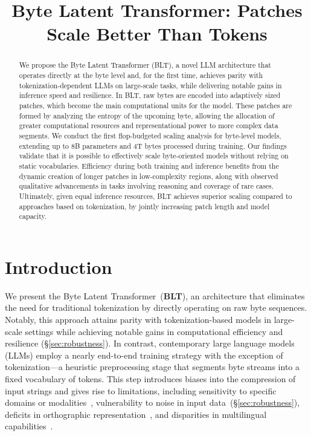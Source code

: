 \title{Byte Latent Transformer: Patches Scale Better Than Tokens}

\begin{abstract}
We propose the Byte Latent Transformer ({\textsc BLT}), a novel LLM architecture that operates directly at the byte level and, for the first time, achieves parity with tokenization-dependent LLMs on large-scale tasks, while delivering notable gains in inference speed and resilience. In {\textsc BLT}, raw bytes are encoded into adaptively sized patches, which become the main computational units for the model. These patches are formed by analyzing the entropy of the upcoming byte, allowing the allocation of greater computational resources and representational power to more complex data segments. We conduct the first flop-budgeted scaling analysis for byte-level models, extending up to 8B parameters and 4T bytes processed during training. Our findings validate that it is possible to effectively scale byte-oriented models without relying on static vocabularies. Efficiency during both training and inference benefits from the dynamic creation of longer patches in low-complexity regions, along with observed qualitative advancements in tasks involving reasoning and coverage of rare cases. Ultimately, given equal inference resources, {\textsc BLT} achieves superior scaling compared to approaches based on tokenization, by jointly increasing patch length and model capacity.
\end{abstract}

\section{Introduction}
\label{section:intro}

We present the Byte Latent Transformer~(\textbf{BLT}), an architecture that eliminates the need for traditional tokenization by directly operating on raw byte sequences. Notably, this approach attains parity with tokenization-based models in large-scale settings while achieving notable gains in computational efficiency and resilience (\S\ref{sec:robustness}). In contrast, contemporary large language models (LLMs) employ a nearly end-to-end training strategy with the exception of tokenization—a heuristic preprocessing stage that segments byte streams into a fixed vocabulary of tokens. This step introduces biases into the compression of input strings and gives rise to limitations, including sensitivity to specific domains or modalities~\citep{dagangetting}, vulnerability to noise in input data~(\S\ref{sec:robustness}), deficits in orthographic representation~\citep{edman2024cute}, and disparities in multilingual capabilities~\citep{liang2023xlm,petrov2024language,limisiewicz2024myte}.

